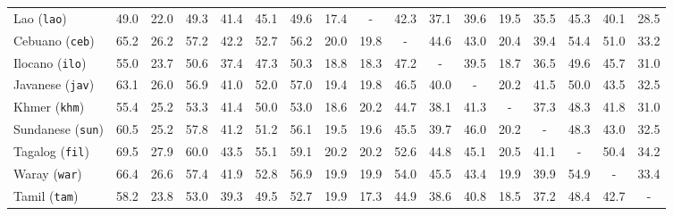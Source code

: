 \begin{table}[ht]
{\begin{tabular}{l *{16}{c}}
Lao (\texttt{lao}) & 49.0 & 22.0 & 49.3 & 41.4 & 45.1 & 49.6 & 17.4 & - & 42.3 & 37.1 & 39.6 & 19.5 & 35.5 & 45.3 & 40.1 & 28.5 \\ %
Cebuano (\texttt{ceb}) & 65.2 & 26.2 & 57.2 & 42.2 & 52.7 & 56.2 & 20.0 & 19.8 & - & 44.6 & 43.0 & 20.4 & 39.4 & 54.4 & 51.0 & 33.2 \\ %
Ilocano (\texttt{ilo}) & 55.0 & 23.7 & 50.6 & 37.4 & 47.3 & 50.3 & 18.8 & 18.3 & 47.2 & - & 39.5 & 18.7 & 36.5 & 49.6 & 45.7 & 31.0 \\ %
Javanese (\texttt{jav}) & 63.1 & 26.0 & 56.9 & 41.0 & 52.0 & 57.0 & 19.4 & 19.8 & 46.5 & 40.0 & - & 20.2 & 41.5 & 50.0 & 43.5 & 32.5 \\ %
Khmer (\texttt{khm}) & 55.4 & 25.2 & 53.3 & 41.4 & 50.0 & 53.0 & 18.6 & 20.2 & 44.7 & 38.1 & 41.3 & - & 37.3 & 48.3 & 41.8 & 31.0 \\ %
Sundanese (\texttt{sun}) & 60.5 & 25.2 & 57.8 & 41.2 & 51.2 & 56.1 & 19.5 & 19.6 & 45.5 & 39.7 & 46.0 & 20.2 & - & 48.3 & 43.0 & 32.5 \\ %
Tagalog (\texttt{fil}) & 69.5 & 27.9 & 60.0 & 43.5 & 55.1 & 59.1 & 20.2 & 20.2 & 52.6 & 44.8 & 45.1 & 20.5 & 41.1 & - & 50.4 & 34.2 \\ %
Waray (\texttt{war}) & 66.4 & 26.6 & 57.4 & 41.9 & 52.8 & 56.9 & 19.9 & 19.9 & 54.0 & 45.5 & 43.4 & 19.9 & 39.9 & 54.9 & - & 33.4 \\ %
Tamil (\texttt{tam}) & 58.2 & 23.8 & 53.0 & 39.3 & 49.5 & 52.7 & 19.9 & 17.3 & 44.9 & 38.6 & 40.8 & 18.5 & 37.2 & 48.4 & 42.7 & - \\ %
\bottomrule
\end{tabular}
}
\end{table}